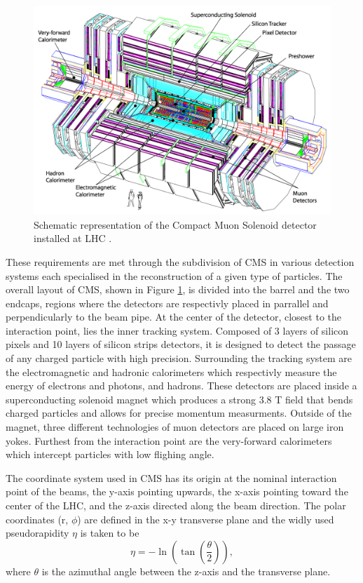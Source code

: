     \begin{figure}[h!]
      \centering
      \includegraphics[width=\textwidth]{img/I-3-cms/cms.png}
      \caption{Schematic representation of the Compact Muon Solenoid detector installed at LHC \cite{1748-0221-3-08-S08004}.}
      \label{fig:I-3-cms-global-view}
    \end{figure}

    These requirements are met through the subdivision of CMS in various detection systems each specialised in the reconstruction of a given type of particles. The overall layout of CMS, shown in Figure \ref{fig:I-3-cms-global-view}, is divided into the barrel and the two endcaps, regions where the detectors are respectivly placed in parrallel and perpendicularly to the beam pipe. At the center of the detector, closest to the interaction point, lies the inner tracking system. Composed of 3 layers of silicon pixels and 10 layers of silicon strips detectors, it is designed to detect the passage of any charged particle with high precision. Surrounding the tracking system are the electromagnetic and hadronic calorimeters which respectivly measure the energy of electrons and photons, and hadrons. These detectors are placed inside a superconducting solenoid magnet which produces a strong 3.8 T field that bends charged particles and allows for precise momentum measurments. Outside of the magnet, three different technologies of muon detectors are placed on large iron yokes. Furthest from the interaction point are the very-forward calorimeters which intercept particles with low flighing angle.

    The coordinate system used in CMS has its origin at the nominal interaction point of the beams, the y-axis pointing upwards, the x-axis pointing toward the center of the LHC, and the z-axis directed along the beam direction. The polar coordinates (r, $ \phi $) are defined in the x-y transverse plane and the widly used pseudorapidity $ \eta $ is taken to be
    \begin{equation}
      \eta = - \ln\left( \tan\left( \frac{\theta}{2} \right) \right) ,
    \end{equation}
    where $ \theta $ is the azimuthal angle between the z-axis and the transverse plane.

